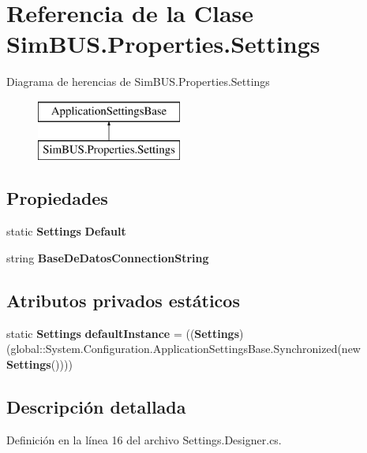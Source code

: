 \section{Referencia de la Clase Sim\-B\-U\-S.\-Properties.\-Settings}
\label{class_sim_b_u_s_1_1_properties_1_1_settings}
Diagrama de herencias de Sim\-B\-U\-S.\-Properties.\-Settings\begin{figure}[H]
\begin{center}
\leavevmode
\includegraphics[height=2.000000cm]{class_sim_b_u_s_1_1_properties_1_1_settings}
\end{center}
\end{figure}
\subsection*{Propiedades}
\begin{DoxyCompactItemize}
\item 
static {\bf Settings} {\bf Default}\hspace{0.3cm}{\ttfamily  [get]}
\item 
string {\bf Base\-De\-Datos\-Connection\-String}\hspace{0.3cm}{\ttfamily  [get]}
\end{DoxyCompactItemize}
\subsection*{Atributos privados estáticos}
\begin{DoxyCompactItemize}
\item 
static {\bf Settings} {\bf default\-Instance} = (({\bf Settings})(global\-::\-System.\-Configuration.\-Application\-Settings\-Base.\-Synchronized(new {\bf Settings}())))
\end{DoxyCompactItemize}


\subsection{Descripción detallada}


Definición en la línea 16 del archivo Settings.\-Designer.\-cs.



